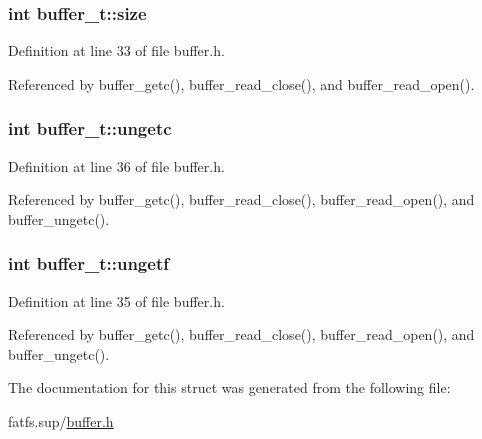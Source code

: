 \subsubsection[{\texorpdfstring{size}{size}}]{\setlength{\rightskip}{0pt plus 5cm}int buffer\+\_\+t\+::size}\hypertarget{structbuffer__t_a34e81d898c6accf4f06ed9c1133d6361}{}\label{structbuffer__t_a34e81d898c6accf4f06ed9c1133d6361}


Definition at line 33 of file buffer.\+h.



Referenced by buffer\+\_\+getc(), buffer\+\_\+read\+\_\+close(), and buffer\+\_\+read\+\_\+open().

\subsubsection[{\texorpdfstring{ungetc}{ungetc}}]{\setlength{\rightskip}{0pt plus 5cm}int buffer\+\_\+t\+::ungetc}\hypertarget{structbuffer__t_aa1fbbf42ce5d6278b21a93647bef3ff1}{}\label{structbuffer__t_aa1fbbf42ce5d6278b21a93647bef3ff1}


Definition at line 36 of file buffer.\+h.



Referenced by buffer\+\_\+getc(), buffer\+\_\+read\+\_\+close(), buffer\+\_\+read\+\_\+open(), and buffer\+\_\+ungetc().

\subsubsection[{\texorpdfstring{ungetf}{ungetf}}]{\setlength{\rightskip}{0pt plus 5cm}int buffer\+\_\+t\+::ungetf}\hypertarget{structbuffer__t_a67c2edddeca1858c670ff57e049a9e0e}{}\label{structbuffer__t_a67c2edddeca1858c670ff57e049a9e0e}


Definition at line 35 of file buffer.\+h.



Referenced by buffer\+\_\+getc(), buffer\+\_\+read\+\_\+close(), buffer\+\_\+read\+\_\+open(), and buffer\+\_\+ungetc().



The documentation for this struct was generated from the following file\+:\begin{DoxyCompactItemize}
\item 
fatfs.\+sup/\hyperlink{buffer_8h}{buffer.\+h}\end{DoxyCompactItemize}
